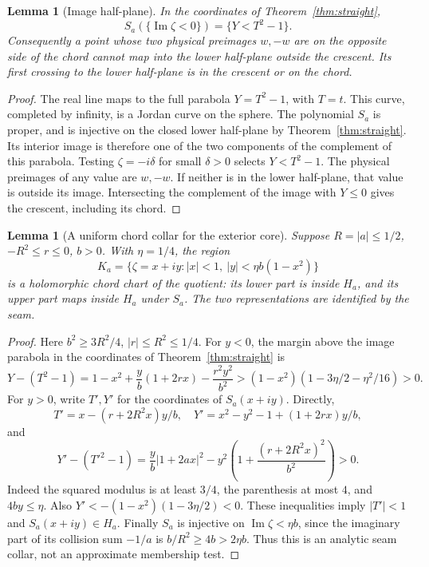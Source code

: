 \documentclass[11pt]{article}
\newtheorem{lemma}[theorem]{Lemma}
\newcommand{\im}{\operatorname{Im}}
\begin{document}
\begin{lemma}[Image half-plane]\label{lem:image}
In the coordinates of Theorem~\ref{thm:straight},
\[
 S_a(\{\im\zeta<0\})=\{Y<T^2-1\}.
\]
Consequently a point whose two physical preimages $w,-w$ are on the
opposite side of the chord cannot map into the lower half-plane outside
the crescent. Its first crossing to the lower half-plane is in the crescent
or on the chord.
\end{lemma}
\begin{proof}
The real line maps to the full parabola $Y=T^2-1$, with $T=t$. This curve,
completed by infinity, is a Jordan curve on the sphere. The polynomial
$S_a$ is proper, and is injective on the closed lower half-plane by
Theorem~\ref{thm:straight}. Its interior image is therefore one of the two
components of the complement of this parabola. Testing $\zeta=-i\delta$
for small $\delta>0$ selects $Y<T^2-1$.
The physical preimages of any value are $w,-w$. If neither is in the lower
half-plane, that value is outside its image. Intersecting the complement
of the image with $Y\le0$ gives the crescent, including its chord.
\end{proof}

\begin{lemma}[A uniform chord collar for the exterior core]\label{lem:collar}
Suppose $R=|a|\le1/2$, $-R^2\le r\le0$, $b>0$. With $\eta=1/4$, the region
\[
 K_a=\{\zeta=x+iy:|x|<1,\ |y|<\eta b(1-x^2)\}
\]
is a holomorphic chord chart of the quotient: its lower part is inside
$H_a$, and its upper part maps inside $H_a$ under $S_a$. The two
representations are identified by the seam.
\end{lemma}
\begin{proof}
Here $b^2\ge3R^2/4$, $|r|\le R^2\le1/4$. For $y<0$, the margin above
the image parabola in the coordinates of Theorem~\ref{thm:straight} is
\[
 Y-(T^2-1)=1-x^2+\frac yb(1+2rx)-\frac{r^2y^2}{b^2}
 >(1-x^2)(1-3\eta/2-\eta^2/16)>0.
\]
For $y>0$, write $T',Y'$ for the coordinates of $S_a(x+iy)$. Directly,
\[
 T'=x-(r+2R^2x)y/b,\quad
 Y'=x^2-y^2-1+(1+2rx)y/b,
\]
and
\[
 Y'-(T'^2-1)=\frac yb|1+2ax|^2
             -y^2\left(1+\frac{(r+2R^2x)^2}{b^2}\right)>0.
\]
Indeed the squared modulus is at least $3/4$, the parenthesis at most $4$,
and $4by\le\eta$. Also $Y'<-(1-x^2)(1-3\eta/2)<0$.
These inequalities imply $|T'|<1$ and $S_a(x+iy)\in H_a$.
Finally $S_a$ is injective on $\im\zeta<\eta b$, since the imaginary part
of its collision sum $-1/a$ is $b/R^2\ge4b>2\eta b$.
Thus this is an analytic seam collar, not an approximate membership test.
\end{proof}
\end{document}
